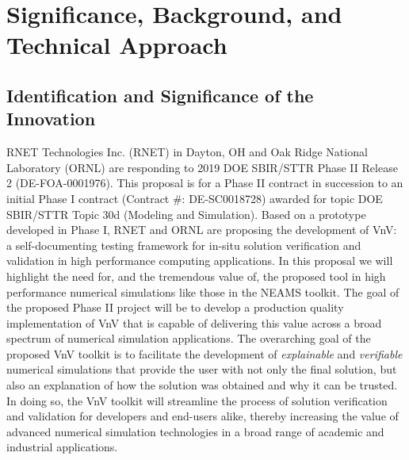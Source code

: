 \section{Significance, Background, and Technical Approach}

\subsection{Identification and Significance of the Innovation}
\label{sec:identification}

RNET Technologies Inc. (RNET) in Dayton, OH and Oak Ridge National Laboratory 
(ORNL) are responding to 2019 DOE SBIR/STTR Phase II Release 2 
(DE-FOA-0001976). This proposal is for a Phase II contract in succession to an 
initial Phase I contract (Contract \#: DE-SC0018728) awarded for topic DOE 
SBIR/STTR Topic 30d (Modeling and Simulation). Based on a prototype developed in Phase I, RNET and ORNL are proposing the development of VnV: a self-documenting 
testing framework for in-situ solution verification and validation in high performance computing applications. In this proposal we will highlight the need for, and the tremendous value of, 
the proposed tool in high performance numerical simulations like those in the NEAMS toolkit. The goal of the proposed Phase II project will be to develop a production quality implementation of VnV that is capable of 
delivering this value across a broad spectrum of numerical simulation applications. The overarching goal of the proposed VnV toolkit is to facilitate the development of \emph{explainable} and \emph{verifiable} numerical simulations that provide 
the user with not only the final solution, but also an explanation of how the solution was obtained and why it can be trusted. In doing so, the VnV toolkit will streamline the process of solution verification and validation for developers and end-users alike, thereby increasing the value of advanced numerical simulation technologies in a broad range of academic and industrial applications.  

